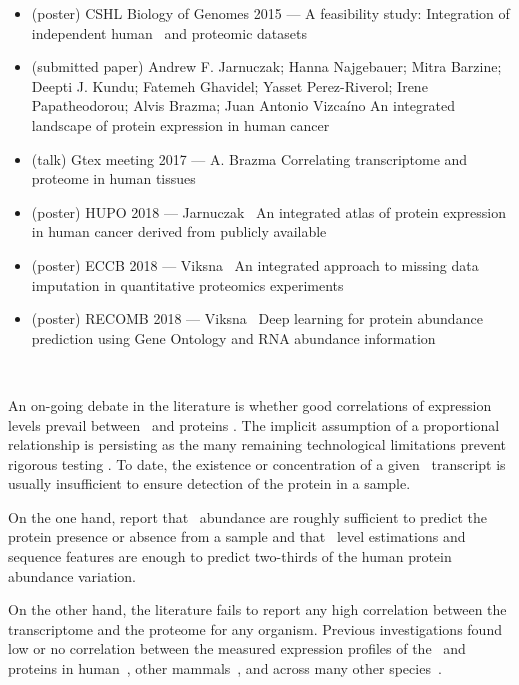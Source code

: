 \derivativeWork{}
\begin{itemize}[topsep=0pt,nosep]
    \item (poster) CSHL  Biology of Genomes 2015 --- A feasibility study:
        Integration of independent human \Rnaseq\ and proteomic datasets
    \item (submitted paper) Andrew F. Jarnuczak; Hanna Najgebauer; Mitra Barzine;
        Deepti J. Kundu; Fatemeh Ghavidel; Yasset Perez-Riverol; Irene Papatheodorou; Alvis Brazma;
        Juan Antonio Vizcaíno An integrated landscape of protein expression in human cancer
    \item (talk) Gtex meeting 2017 --- A. Brazma Correlating transcriptome
        and proteome in human tissues
    \item (poster) HUPO 2018 --- Jarnuczak \etal\ An integrated atlas of
        protein expression in human cancer derived from publicly available
    \item (poster) ECCB 2018 --- Viksna \etal\ An integrated approach
        to missing data imputation in quantitative proteomics experiments
    \item (poster) RECOMB 2018 --- Viksna \etal\ Deep learning
        for protein abundance prediction using Gene Ontology and RNA abundance information
\end{itemize}

\clearpage\

\vspace{-1cm}

An on-going debate in the literature is
whether good correlations of expression levels prevail
between \mRNAs\ and proteins .
The implicit assumption of a proportional relationship is persisting
as the many remaining technological limitations prevent
rigorous testing .
To date, the existence or concentration of a given \mRNA\ transcript
is usually insufficient to ensure detection of the protein in a sample.\mybr\

On the one hand,
\citet{Ramakrishnan2009-lv} report that
\mRNAs\ abundance are roughly sufficient to predict
the protein presence or absence from a sample and
\citet{Vogel2010-ux} that
\mRNA\ level estimations and sequence features are enough to predict
two-thirds of the human protein abundance variation.\\
\vspace{-\baselineskip}

On the other hand,
the literature fails to report any high correlation
between the transcriptome and the proteome for any organism.
Previous investigations found low or no correlation
between the measured expression profiles of the \mRNAs\ and
proteins in human~,
other mammals~,
and across many other species~.

